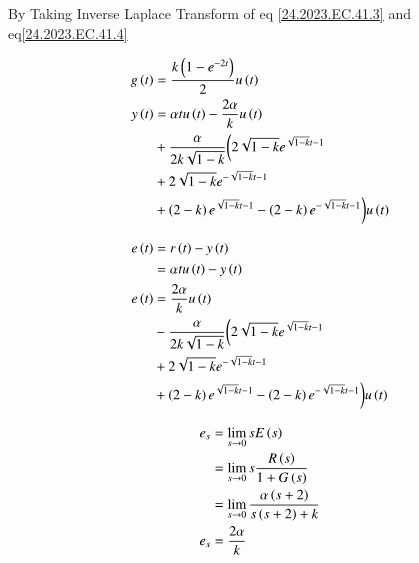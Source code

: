\documentclass[journal,12pt,twocolumn]{IEEEtran}
\theoremstyle{remark}
\begin{document}
By Taking Inverse Laplace Transform of eq \eqref{24.2023.EC.41.3} and eq\eqref{24.2023.EC.41.4}

\begin{align}
    g\left(t\right) &= \frac{k\left(1 - e^{-2t}\right)}{2} u\left(t\right) \\
        y\left(t\right) &= \alpha t u\left(t\right)- \frac{2\alpha}{k}u\left(t\right) \\
        \notag &+\frac{\alpha}{2k\sqrt{1-k}} \biggl(2\sqrt{1-k}e^{\sqrt{1-k}t-1}\\ 
        \notag &+ 2\sqrt{1-k}e^{-\sqrt{1-k}t-1} \\
        \notag &+ \left(2-k\right)e^{\sqrt{1-k}t-1} - \left(2-k\right)e^{-\sqrt{1-k}t-1} \biggr) u\left(t\right)
\end{align}

\begin{align}
        e\left(t\right) &= r\left(t\right) - y\left(t\right) \\
        &= \alpha t u\left(t\right) - y\left(t\right) \\
        e\left(t\right) &= \frac{2\alpha}{k}u\left(t\right) \\
        \notag &-\frac{\alpha}{2k\sqrt{1-k}} \biggl(2\sqrt{1-k}e^{\sqrt{1-k}t-1}\\ 
        \notag &+ 2\sqrt{1-k}e^{-\sqrt{1-k}t-1} \\
        \notag &+ \left(2-k\right)e^{\sqrt{1-k}t-1} - \left(2-k\right)e^{-\sqrt{1-k}t-1} \biggr) u\left(t\right)
\end{align}
	

\begin{align}
    e_s &= \displaystyle\lim_{s\to 0}s E\left(s\right) \\
    &= \displaystyle\lim_{s\to 0} s \frac{R\left(s\right)}{1 + G\left(s\right)} \\
    &= \displaystyle\lim_{s\to 0} \frac{\alpha \left(s+2\right)}{s\left(s+2\right) + k} \\
    e_s &= \frac{2\alpha}{k}
\end{align}
\end{document}
